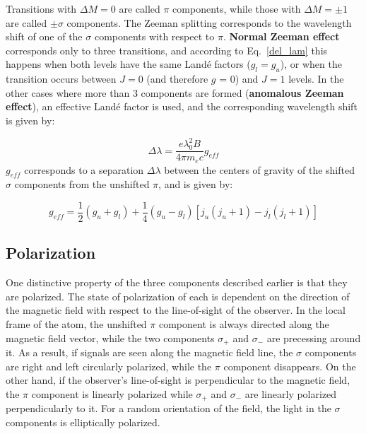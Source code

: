 \documentclass[goettingen, gauss, print]{thesis}
\begin{document}
Transitions with $\Delta M = 0$ are called $\pi$ components, while those with $\Delta M = \pm 1$ are called $\pm \sigma$ components. The Zeeman splitting corresponds to the wavelength shift of one of the $\sigma$ components with respect to $\pi$.
\textbf{Normal Zeeman effect} corresponds only to three transitions, and according to Eq.~\ref{del_lam} this happens when both levels have the same Land\'{e} factors ($g_l = g_u$), or when the transition occurs between $J=0$ (and therefore $g$ = 0) and $J=1$ levels.  
In the other cases where more than 3 components are formed (\textbf{anomalous Zeeman effect}), an effective Land\'{e} factor is used, and the corresponding wavelength shift is given by:

\begin{equation}
\Delta \lambda = \frac{e\lambda_0^2B}{4\pi m_e c}g_{eff}
\label{del_lam_2}
\end{equation}
$g_{eff}$ corresponds to a separation $\Delta \lambda$ between the centers of gravity of the shifted $\sigma$ components from the unshifted $\pi$, and is given by:

\begin{equation}
g_{eff} = \frac{1}{2}(g_u+g_l)+\frac{1}{4}(g_u-g_l)[j_u(j_u+1)-j_l(j_l+1)]
\label{g_eff}
\end{equation}


\subsection{Polarization}
\label{intro-Polarization}
One distinctive property of the three components described earlier is that they are polarized. The state of polarization of each is dependent on the direction of the magnetic field with respect to the line-of-sight of the observer.
In the local frame of the atom, the unshifted $\pi$ component is always directed along the magnetic field vector, while the two components $\sigma_{+}$ and $\sigma_{-}$ are precessing around it. As a result, if signals are seen along the magnetic field line, the $\sigma$ components are right and left circularly polarized, while the $\pi$ component disappears. On the other hand, if the observer's line-of-sight is perpendicular to the magnetic field, the $\pi$ component is linearly polarized while $\sigma_{+}$ and $\sigma_{-}$ are linearly polarized perpendicularly to it.
For a random orientation of the field, the light in the $\sigma$ components is elliptically polarized.
\end{document}
